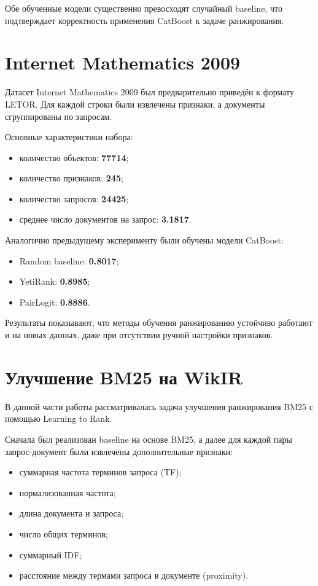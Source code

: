 \documentclass[11pt]{article}
\begin{document}
Обе обученные модели существенно превосходят случайный baseline, что подтверждает
корректность применения CatBoost к задаче ранжирования.

\section{Internet Mathematics 2009}

Датасет Internet Mathematics 2009 был предварительно приведён к формату LETOR.
Для каждой строки были извлечены признаки, а документы сгруппированы по запросам.

Основные характеристики набора:
\begin{itemize}
    \item количество объектов: \textbf{77714};
    \item количество признаков: \textbf{245};
    \item количество запросов: \textbf{24425};
    \item среднее число документов на запрос: \textbf{3.1817}.
\end{itemize}

Аналогично предыдущему эксперименту были обучены модели CatBoost:

\begin{itemize}
    \item Random baseline: \textbf{0.8017};
    \item YetiRank: \textbf{0.8985};
    \item PairLogit: \textbf{0.8886}.
\end{itemize}

Результаты показывают, что методы обучения ранжированию устойчиво работают и на
новых данных, даже при отсутствии ручной настройки признаков.

\section{Улучшение BM25 на WikIR}

В данной части работы рассматривалась задача улучшения ранжирования BM25 с помощью
Learning to Rank.

Сначала был реализован baseline на основе BM25, а далее для каждой пары
запрос-документ были извлечены дополнительные признаки:
\begin{itemize}
    \item суммарная частота терминов запроса (TF);
    \item нормализованная частота;
    \item длина документа и запроса;
    \item число общих терминов;
    \item суммарный IDF;
    \item расстояние между термами запроса в документе (proximity).
\end{itemize}
\end{document}
